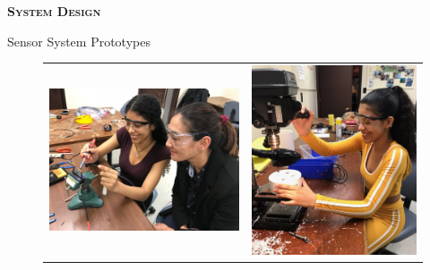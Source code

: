 \documentclass[final,t]{beamer}
\begin{document}
\begin{frame}{}
\begin{columns}
\begin{column}{.5\linewidth}
\begin{exampleblock}{\textsc{\textbf{System Design}}}
\begin{block}{Sensor System Prototypes}

                    \begin{center}
                    \begin{figure}
                    \begin{tabular}{cc}
                    \includegraphics[scale = 0.15]{assets/IMG_9097.JPG}
                    \hspace*{5mm}
                    &
                    \includegraphics[scale = 0.42]{assets/meworking1}

\end{tabular}
\end{figure}
\end{center}
\end{block}
\end{exampleblock}
\end{column}
\end{columns}
\end{frame}
\end{document}
